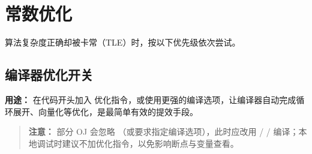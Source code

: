 \section{常数优化}

算法复杂度正确却被卡常（TLE）时，按以下优先级依次尝试。

\subsection{编译器优化开关}

\textbf{用途：} 在代码开头加入  优化指令，或使用更强的编译选项，让编译器自动完成循环展开、向量化等优化，是最简单有效的提效手段。



\begin{quote}
  \textbf{注意：} 部分 OJ 会忽略 （或要求指定编译选项），此时应改用  /  /  编译；本地调试时建议不加优化指令，以免影响断点与变量查看。
\end{quote}
